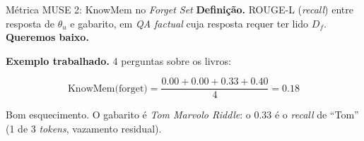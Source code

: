 \documentclass[aspectratio=169,xcolor=dvipsnames]{beamer}
\begin{document}
  \begin{frame}{Métrica MUSE 2: KnowMem no \textit{Forget Set}}
    \textbf{Definição.} ROUGE-L (\textit{recall}) entre resposta de $\theta_u$ e gabarito, em \textit{QA factual} cuja resposta requer ter lido $D_f$. \textbf{Queremos baixo.}

    \vspace{0.3em}
    \textbf{Exemplo trabalhado.} 4 perguntas sobre os livros:

    \centering

    \vspace{0.3em}
    \[
      \text{KnowMem(forget)} = \frac{0.00 + 0.00 + 0.33 + 0.40}{4} = \mathbf{0.18}
    \]

    \footnotesize Bom esquecimento. O gabarito é \textit{Tom Marvolo Riddle}: o $0.33$ é o \textit{recall} de ``Tom'' (1 de 3 \textit{tokens}, vazamento residual).
  \end{frame}
\end{document}
